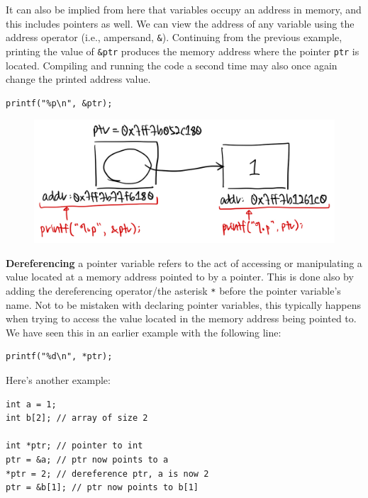 It can also be implied from here that variables occupy an address in memory, and this includes pointers as well.
We can view the address of any variable using the address operator (i.e., ampersand, \verb|&|).
Continuing from the previous example, printing the value of \verb|&ptr| produces the memory address where the pointer \verb|ptr| is located.
Compiling and running the code a second time may also once again change the printed address value.

\begin{verbatim}
printf("%p\n", &ptr);
\end{verbatim}

\begin{figure}
    \includegraphics[width=\linewidth]{pointers.jpg}
\end{figure}

\textbf{Dereferencing} a pointer variable refers to the act of accessing or manipulating a value located at a memory address pointed to by a pointer.
This is done also by adding the dereferencing operator/the asterisk \verb|*| before the pointer variable's name.
Not to be mistaken with declaring pointer variables, this typically happens when trying to access the value located in the memory address being pointed to.
We have seen this in an earlier example with the following line:

\begin{verbatim}
printf("%d\n", *ptr);
\end{verbatim}

Here's another example:

\begin{verbatim}
int a = 1;
int b[2]; // array of size 2

int *ptr; // pointer to int
ptr = &a; // ptr now points to a
*ptr = 2; // dereference ptr, a is now 2
ptr = &b[1]; // ptr now points to b[1]
\end{verbatim}


